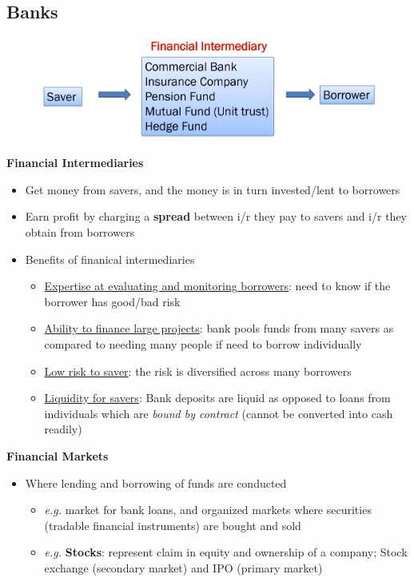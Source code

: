 \documentclass{article}
\newcommand{\eg}[0]{\textit{e.g. }}
\begin{document}
\begin{multicols}{2}
\subsection{Banks}
\begin{figure}[H]
	\centering
	\includegraphics[width=\columnwidth]{images/fin_intermediaries.png}
\end{figure}
\textbf{Financial Intermediaries}
\begin{itemize}
	\item Get money from savers, and the money is in turn invested/lent to borrowers
	\item Earn profit by charging a \textbf{spread} between i/r they pay to savers and i/r they obtain from borrowers
	\item Benefits of finanical intermediaries
	\begin{itemize}
		\item \underline{Expertise at evaluating and monitoring borrowers}: need to know if the borrower has good/bad risk
		\item \underline{Ability to finance large projects}: bank pools funds from many savers as compared to needing many people if need to borrow individually
		\item \underline{Low risk to saver}: the risk is diversified across many borrowers
		\item \underline{Liquidity for savers}: Bank deposits are liquid as opposed to loans from individuals which are \textit{bound by contract} (cannot be converted into cash readily)
	\end{itemize}
\end{itemize}
\textbf{Financial Markets}
\begin{itemize}
	\item Where lending and borrowing of funds are conducted
	\begin{itemize}
		\item \eg market for bank loans, and organized markets where securities (tradable financial instruments) are bought and sold
		\item \eg \textbf{Stocks}: represent claim in equity and ownership of a company; Stock exchange (secondary market) and IPO (primary market)

\end{itemize}
\end{itemize}
\end{multicols}
\end{document}
